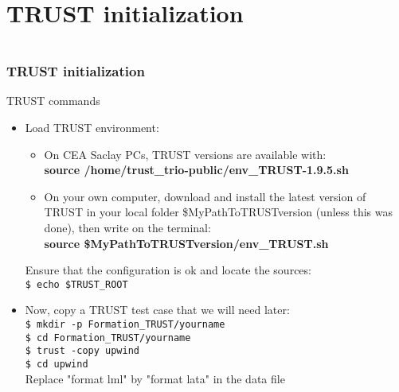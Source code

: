 \documentclass[10pt, hyperref={unicode=true,pdfusetitle, bookmarks=true,bookmarksnumbered=false,bookmarksopen=false, breaklinks=false,pdfborder={0 0 1},backref=true,colorlinks=true,linkcolor=darkblue,pageanchor, urlcolor=darkblue}]{beamer}
\begin{document}
\section{{\bf{TRUST initialization }}}
\begin{frame}
\begin{columns}[c] 
\tableofcontents[sections={1-4},currentsection, currentsubsection]
\tableofcontents[sections={5-10},currentsection, currentsubsection]
\end{columns}
\end{frame}
\begin{frame}
\frametitle{TRUST initialization}\label{initTrust}
\begin{block}{TRUST commands}

\begin{itemize}
\item Load TRUST environment:
\begin{itemize}
\item On CEA Saclay PCs, TRUST versions are available with:\\
\textbf{source  /home/trust\_trio-public/env\_TRUST-1.9.5.sh}
%
\item On your own computer, download and install the latest version of TRUST in your local folder \$MyPathToTRUSTversion (unless this was done), then write on the terminal:\\
%
\textbf{source  \$MyPathToTRUSTversion/env\_TRUST.sh}
%
\end{itemize}
%

Ensure that the configuration is ok and locate the sources:\\
\texttt{\$ echo \$TRUST\_ROOT}

\item Now, copy a TRUST test case that we will need later:\\
\texttt{\$ mkdir -p Formation\_TRUST/yourname}\\
\texttt{\$ cd Formation\_TRUST/yourname}\\
\texttt{\$ trust -copy upwind}\\
\texttt{\$ cd upwind}\\
Replace "format lml" by "format lata" in the data file\\
\end{itemize}

\end{block}
\end{frame}
\end{document}
